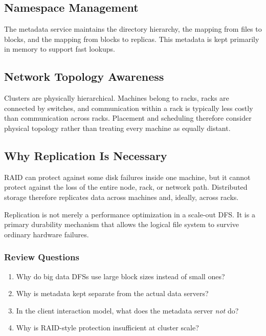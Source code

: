 \documentclass[11pt,a4paper,oneside]{book}
\begin{document}
\subsection{Namespace Management}

The metadata service maintains the directory hierarchy, the mapping from files to blocks, and the mapping from blocks to replicas. This metadata is kept primarily in memory to support fast lookups.

\subsection{Network Topology Awareness}

Clusters are physically hierarchical. Machines belong to racks, racks are connected by switches, and communication within a rack is typically less costly than communication across racks. Placement and scheduling therefore consider physical topology rather than treating every machine as equally distant.

\subsection{Why Replication Is Necessary}

RAID can protect against some disk failures inside one machine, but it cannot protect against the loss of the entire node, rack, or network path. Distributed storage therefore replicates data across machines and, ideally, across racks.

\begin{keyconcept}
Replication is not merely a performance optimization in a scale-out DFS. It is a primary durability mechanism that allows the logical file system to survive ordinary hardware failures.
\end{keyconcept}

\subsubsection*{Review Questions}
\begin{enumerate}
    \item Why do big data DFSs use large block sizes instead of small ones?
    \item Why is metadata kept separate from the actual data servers?
    \item In the client interaction model, what does the metadata server \emph{not} do?
    \item Why is RAID-style protection insufficient at cluster scale?
\end{enumerate}
\end{document}

